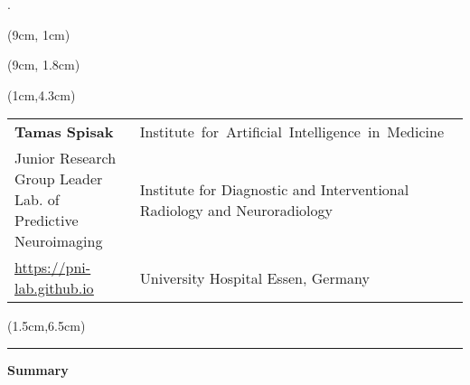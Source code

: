 \begin{titlepage}.
    

    \vspace{2.5cm}

    \begin{textblock*}{15cm}(9cm, 1cm)
        \begin{huge}
                \makeatletter
                \noindent\textcolor{black}{\@title}
                \makeatother
        \end{huge}
    \end{textblock*}
    \begin{textblock*}{11cm}(9cm, 1.8cm)
        \begin{LARGE}
                \makeatletter
                \noindent\textcolor{black}{\mysubtitle}
                \makeatother
        \end{LARGE}
    \end{textblock*}

    \begin{textblock*}{22cm}(1cm,4.3cm)
        \makeatletter
        \begin{large}
            \setcellgapes{0.5pt}
            \makegapedcells
            {\color{black}\begin{tabularx}{22cm}{p{6.5cm}p{8.5cm}}
                \textbf{Tamas Spisak} & \mbox{Institute for Artificial Intelligence in Medicine}   \\
                Junior Research Group Leader \newline Lab. of Predictive Neuroimaging & Institute for Diagnostic and Interventional \mbox{Radiology} and Neuroradiology  \\
                \href{https://pni-lab.github.io}{\color{pniblue}\underline{https://pni-lab.github.io}} & University Hospital Essen, Germany
            \end{tabularx}}
        \end{large}
        \makeatother
    \end{textblock*}

    \begin{textblock*}{18cm}(1.5cm,6.5cm)
        \begin{large}
            \begin{center}
                \par\noindent\rule{\textwidth\color{pniblue}}{0.4pt}
                \textbf{\color{pniblue}Summary}
            \end{center}


\end{large}
\end{textblock*}
\end{titlepage}
